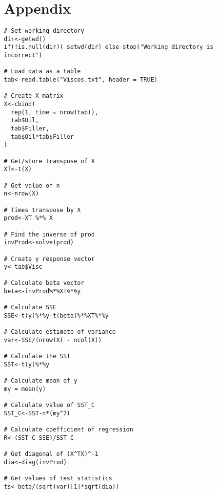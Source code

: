 \documentclass[12pt]{article}
\begin{document}
\section{Appendix}
\UseRawInputEncoding
\begin{lstlisting}[caption={Linear regression equation method},label={lin_code}]
# Set working directory
dir<-getwd()
if(!is.null(dir)) setwd(dir) else stop("Working directory is incorrect")

# Load data as a table
tab<-read.table("Viscos.txt", header = TRUE)

# Create X matrix
X<-cbind(
  rep(1, time = nrow(tab)),
  tab$Oil,
  tab$Filler,
  tab$Oil*tab$Filler
)

# Get/store transpose of X
XT<-t(X)

# Get value of n
n<-nrow(X)

# Times transpose by X
prod<-XT %*% X

# Find the inverse of prod
invProd<-solve(prod)

# Create y response vector
y<-tab$Visc

# Calculate beta vector
beta<-invProd%*%XT%*%y

# Calculate SSE
SSE<-t(y)%*%y-t(beta)%*%XT%*%y

# Calculate estimate of variance
var<-SSE/(nrow(X) - ncol(X))

# Calculate the SST
SST<-t(y)%*%y

# Calculate mean of y
my = mean(y)

# Calculate value of SST_C
SST_C<-SST-n*(my^2)

# Calculate coefficient of regression
R<-(SST_C-SSE)/SST_C

# Get diagonal of (X^TX)^-1
dia<-diag(invProd)

# Get values of test statistics
ts<-beta/(sqrt(var)[1]*sqrt(dia))
\end{lstlisting}
\end{document}
